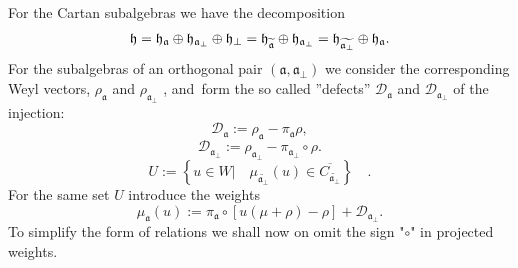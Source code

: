 \documentclass[12pt]{article}
\theoremstyle{definition}
\newcommand{\af}{\mathfrak{a}}
\begin{document}
For the Cartan subalgebras we have the decomposition
\begin{equation}
\frak{h}=\frak{\frak{h}_{\af}}\oplus \frak{h}_{\af_{\perp }}\oplus
\frak{h}_{\perp }=\frak{\frak{h}_{\widetilde{\af}}}\oplus \frak{h}_{%
\af_{\perp }}=\frak{\frak{h}_{\widetilde{\af_{\perp }}}}\oplus
\frak{h}_{\af}.
\end{equation}
For the subalgebras of an orthogonal pair $\left( \af,\af_{\perp
}\right) $ we consider the corresponding Weyl vectors, $\rho _{\af}$
and $\rho _{\af_{\perp }}$ , and\ form the so called ''defects'' $%
\mathcal{D}_{\af}$ and $\mathcal{D}_{\af_{\perp }}$ of the
injection:
\begin{equation}
\mathcal{D}_{\af}:=\rho _{\af}-\pi _{\af}\rho ,
\end{equation}
\begin{equation}
\label{defect-perp}
\mathcal{D}_{\af_{\perp }}:=\rho _{\af_{\perp }}-\pi _{\af%
_{\perp }}\circ\rho .
\end{equation}
\begin{equation}
U:=\left\{ u\in W|\quad \mu _{\widetilde{\af_{\perp }}}\left( u\right)
\in \overline{C_{\widetilde{\af_{\perp }}}}\right\} \quad .
\label{U-def}
\end{equation}
For the same set $U$ introduce the weights
\begin{equation*}
\mu _{\af}\left( u\right) :=\pi _{\af}\circ\left[ u(\mu +\rho )-\rho %
\right] +\mathcal{D}_{\af_{\perp }}.
\end{equation*}
To simplify the form of relations we shall now on omit the sign "$\circ$" in projected
weights.
\end{document}
